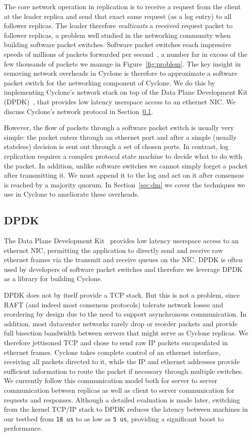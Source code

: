 \documentclass[twocolumn]{article}
\begin{document}
The core network operation in replication is to receive a request from the
client at the leader replica and send that exact same request (as a log entry)
to all follower replicas. The leader therefore \emph{multicasts} a received
request packet to follower replicas, a problem well studied in the networking
community when building software packet switches. Software packet switches reach
impressive speeds of millions of packets forwarded per second~\cite{dpdk_perf}, 
a number far in excess of the few thousands of packets we manage in
Figure~\ref{fig:problem}. The key insight in removing network overheads in
Cyclone is therefore to approximate a software packet switch for the networking
component of Cyclone. We do this by implementing Cyclone's network stack on top
of the Data Plane Development Kit (DPDK)~\cite{dpdk}, that provides low latency
userspace access to an ethernet NIC. We discuss Cyclone's network protocol in
Section~\ref{sec:netprot}.

However, the flow of packets through a software packet switch is usually very
simple: the packet enters through an ethernet port and after a simple (usually
stateless) decision is sent out through a set of chosen ports.  In contrast, log
replication requires a complex protocol state machine to decide what to do with
the packet. In addition, unlike software switches we cannot simply forget a
packet after transmitting it. We must append it to the log and act on it after
consensus is reached by a majority quorum. In Section~\ref{sec:dm} we cover the
techniques we use in Cyclone to ameliorate these overheads.

\subsection{DPDK}
\label{sec:netprot}
The Data Plane Development Kit~\cite{dpdk} provides low latency userspace access
to an ethernet NIC, permitting the application to directly send and receive raw
ethernet frames via the transmit and receive queues on the NIC. DPDK is often
used by developers of software packet switches and therefore we leverage
DPDK as a library for building Cyclone.

DPDK does not by itself provide a TCP stack. But this is not a problem, since
RAFT (and indeed most consensus protocols) tolerate network losses and
reordering by design due to the need to support asynchronous communication. In
addition, most datacenter networks rarely drop or reorder packets and provide
full bisection bandwidth between servers that might serve as Cyclone replicas. We
therefore jettisoned TCP and chose to send raw IP packets encapsulated in
ethernet frames. Cyclone takes complete control of an ethernet interface,
receiving all packets directed to it, while the IP and ethernet addresses
provide sufficient information to route the packet if necessary through multiple
switches. We currently follow this communication model both for server to server
communication between replicas as well as client to server communication for
requests and responses. Although a detailed evaluation is made later, switching
from the kernel TCP/IP stack to DPDK reduces the latency between machines in our
testbed from {\tt 18 us} to as low as {\tt 5 us}, providing a significant boost
to performance.
\end{document}
